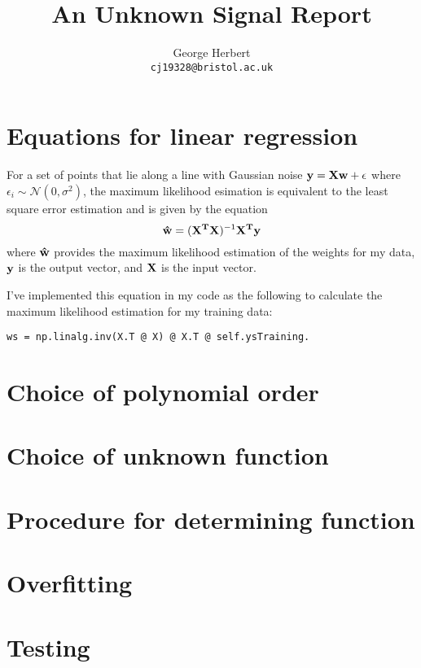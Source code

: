 \documentclass[onecolumn, 12pt, a4paper]{article}
\author{
  George Herbert\\
  \texttt{cj19328@bristol.ac.uk}
}
\title{An Unknown Signal Report}
\begin{document}
\maketitle

\section{Equations for linear regression}

For a set of points that lie along a line with Gaussian noise 
$\vb{y} = \vb{X}\vb{w} + \vb{\epsilon}$ where $\epsilon_{i} \sim \mathcal{N}(0, \sigma^{2})$,
the maximum likelihood esimation is equivalent to the least square 
error estimation and is given by the equation
\[
    \vb{\hat{w}} = (\vb{X^{T}}\vb{X})^{-1}\vb{X^{T}}\vb{y}
\]
where $\vb{\hat{w}}$ provides the maximum likelihood estimation of the
weights for my data, $\vb{y}$ is the output vector, and $\vb{X}$ is 
the input vector.

I've implemented this equation in my code as the following to calculate
the maximum likelihood estimation for my training data:
\begin{verbatim}
ws = np.linalg.inv(X.T @ X) @ X.T @ self.ysTraining.
\end{verbatim}

\section{Choice of polynomial order}

\section{Choice of unknown function}

\section{Procedure for determining function}

\section{Overfitting}

\section{Testing}
\end{document}
